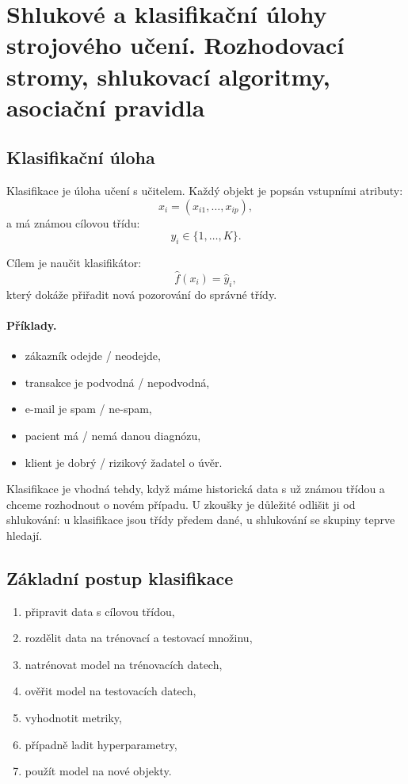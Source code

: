 \section{Shlukové a klasifikační úlohy strojového učení. Rozhodovací stromy, shlukovací algoritmy, asociační pravidla}


\subsection{Klasifikační úloha}

Klasifikace je úloha učení s učitelem. Každý objekt je popsán vstupními atributy:
\[
x_i=(x_{i1},\ldots,x_{ip}),
\]
a má známou cílovou třídu:
\[
y_i\in\{1,\ldots,K\}.
\]

Cílem je naučit klasifikátor:
\[
\hat{f}(x_i)=\hat{y}_i,
\]
který dokáže přiřadit nová pozorování do správné třídy.

\paragraph{Příklady.}
\begin{itemize}
    \item zákazník odejde / neodejde,
    \item transakce je podvodná / nepodvodná,
    \item e-mail je spam / ne-spam,
    \item pacient má / nemá danou diagnózu,
    \item klient je dobrý / rizikový žadatel o úvěr.
\end{itemize}

Klasifikace je vhodná tehdy, když máme historická data s už známou třídou a chceme rozhodnout o novém
případu. U zkoušky je důležité odlišit ji od shlukování: u klasifikace jsou třídy předem dané, u shlukování
se skupiny teprve hledají.

\subsection{Základní postup klasifikace}

\begin{enumerate}
    \item připravit data s cílovou třídou,
    \item rozdělit data na trénovací a testovací množinu,
    \item natrénovat model na trénovacích datech,
    \item ověřit model na testovacích datech,
    \item vyhodnotit metriky,
    \item případně ladit hyperparametry,
    \item použít model na nové objekty.
\end{enumerate}

